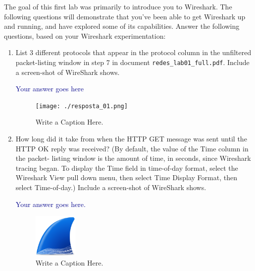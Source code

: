 \documentclass{article}
\begin{document}

\noindent
The goal of this first lab was primarily to introduce you to Wireshark. The following
questions will demonstrate that you’ve been able to get Wireshark up and running, and
have explored some of its capabilities. Answer the following questions, based on your
Wireshark experimentation:

\bigskip

\begin{enumerate}[1.]
\item List 3 different protocols that appear in the protocol column in the unfiltered
  packet-listing window in step 7 in document
  \texttt{re\-des\_\-lab01\_\-full.\-pdf}. Include a screen-shot of
  WireShark shows. \smallskip

    \textcolor{darkblue}{%
      Your answer goes here
      }
    
      \medskip
      
\begin{figure}[h]
  \centering
  \texttt{[image: ./resposta\_01.png]} 
  \caption{Write a Caption Here.}
  \label{fig:answer:1}
\end{figure}



  \item How long did it take from when the HTTP GET message was sent until the HTTP OK
    reply was received? (By default, the value of the Time column in the packet- listing
    window is the amount of time, in seconds, since Wireshark tracing began. To display
    the Time field in time-of-day format, select the Wireshark View pull down menu, then
    select Time Display Format, then select Time-of-day.) Include a screen-shot of
  WireShark shows. \smallskip

    \textcolor{darkblue}{%
      Your answer goes here.
      }
    
    \medskip 
      
\begin{figure}[h]
  \centering
  \includegraphics[width=0.2\textwidth]{./shark.png} 
  \caption{Write a Caption Here.}
  \label{fig:answer:2}
\end{figure}



\end{enumerate}
\end{document}

